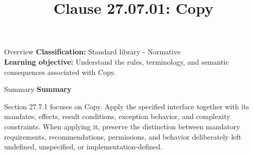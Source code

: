 \documentclass[10pt,letterpaper]{article}
\title{Clause 27.07.01: Copy}
\author{}
\date{}
\begin{document}
\maketitle
\begin{CornellOverviewBox}{Overview}
\textbf{Classification:} Standard library - Normative\\[2pt]
\textbf{Learning objective:} Understand the rules, terminology, and semantic consequences associated with Copy.
\end{CornellOverviewBox}\begin{CornellSummaryBox}{Summary}
{\sffamily\bfseries\color{Accent} Summary}\par\vspace{3pt}Section 27.7.1 focuses on Copy. Apply the specified interface together with its mandates, effects, result conditions, exception behavior, and complexity constraints. When applying it, preserve the distinction between mandatory requirements, recommendations, permissions, and behavior deliberately left undefined, unspecified, or implementation-defined.
\end{CornellSummaryBox}
\end{document}
